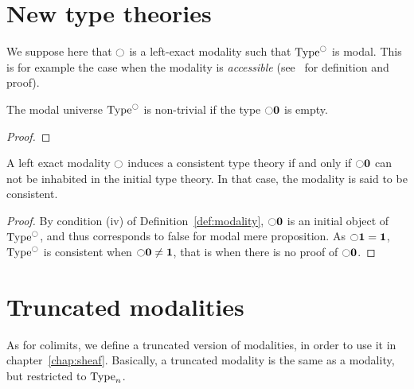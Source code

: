 \section{New type theories}
\label{sec:new-type-theories}



We suppose here that $\ocircle$ is a left-exact modality such that
$\operatorname{Type}^{\ocircle}$ is modal.
This is for example the case when the modality is {\em accessible}
(see~\cite{hottlib} for definition and proof).

\begin{prop}
  The modal universe $\operatorname{Type}^{\ocircle}$ is non-trivial if the type $\ocircle
  \mathbf{0}$ is empty.
\end{prop}
\begin{proof}
  
\end{proof}


\begin{prop}\label{prop:consistent}
  A left exact modality $\ocircle$ induces a consistent type theory if
  and only if $\ocircle \mathbf{0}$ can not be inhabited in the initial type
  theory. In that case, the modality is said to be consistent.
\end{prop}
\begin{proof}
  By condition (iv) of Definition~\ref{def:modality},
  $\ocircle \mathbf{0}$ is an initial object of $\operatorname{Type}^{\ocircle}$, and thus
  corresponds to false for modal mere proposition.
  As $\ocircle \mathbf{1} = \mathbf{1}$, $\operatorname{Type}^{\ocircle}$ is consistent when
  $\ocircle \mathbf{0} \neq \mathbf{1}$, that is when there is no proof of
  $\ocircle \mathbf{0}$.
\end{proof}

\section{Truncated modalities}
\label{sec:trunc_modalities}

As for colimits, we define a truncated version of modalities, in order
to use it in chapter~\ref{chap:sheaf}. Basically, a truncated modality
is the same as a modality, but restricted to $\operatorname{Type}_n$. 

